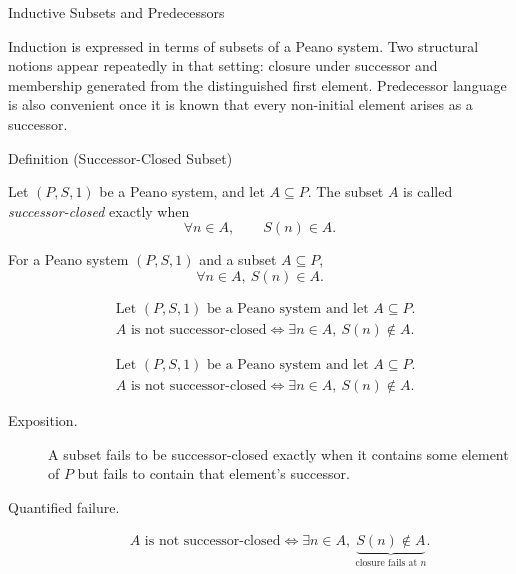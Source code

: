 \begin{topicbox}{Inductive Subsets and Predecessors}
\begin{exposition}
Induction is expressed in terms of subsets of a Peano system. Two structural
notions appear repeatedly in that setting: closure under successor and
membership generated from the distinguished first element. Predecessor language
is also convenient once it is known that every non-initial element arises as a
successor.
\end{exposition}

\begin{definitionbox}{Definition (Successor-Closed Subset)}
\begin{definition}
\label{def:successor-closed-subset}
Let $(P,S,1)$ be a Peano system, and let $A \subseteq P$. The subset $A$ is
called \emph{successor-closed} exactly when
\[
\forall n \in A,\qquad S(n) \in A.
\]
\end{definition}
\end{definitionbox}

\begin{remark*}
For a Peano system $(P,S,1)$ and a subset $A\subseteq P$,
\[
\forall n \in A,\ S(n) \in A.
\]
\end{remark*}

\begin{remark*}
\[
\begin{aligned}
&\text{Let } (P,S,1) \text{ be a Peano system and let } A \subseteq P.\\
&A \text{ is not successor-closed}
\Longleftrightarrow
\exists n \in A,\ S(n) \notin A.
\end{aligned}
\]
\end{remark*}

\begin{remark*}
\[
\begin{aligned}
&\text{Let } (P,S,1) \text{ be a Peano system and let } A \subseteq P.\\
&A \text{ is not successor-closed}
\Longleftrightarrow
\exists n \in A,\ S(n) \notin A.
\end{aligned}
\]
\end{remark*}

\begin{remark*}
\begin{description}
  \item[Exposition.]
  A subset fails to be successor-closed exactly when it contains some element
  of $P$ but fails to contain that element's successor.
  \item[Quantified failure.]
  \[
  \begin{aligned}
  A \text{ is not successor-closed}
  \Longleftrightarrow
  \exists n \in A,\ \underbrace{S(n) \notin A}_{\text{closure fails at } n}.
  \end{aligned}
  \]


\end{description}
\end{remark*}
\end{topicbox}
